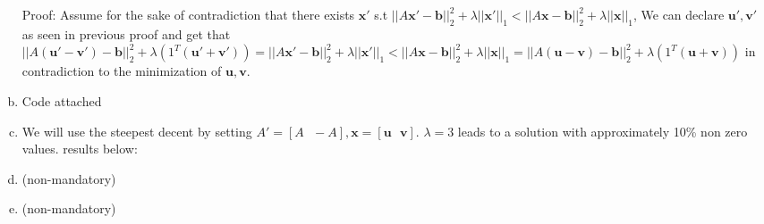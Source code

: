 \documentclass{article}
\begin{document}
\begin{enumerate}[(a)]
Proof: Assume for the sake of contradiction that there exists $\mathbf{x}'$ s.t
$||A\mathbf{x}' - \mathbf{b}||_2^2 + \lambda||\mathbf{x}'||_1 < ||A\mathbf{x} - \mathbf{b}||_2^2 + \lambda||\mathbf{x}||_1$, We can declare $\mathbf{u}', \mathbf{v}'$ as seen in previous proof and get that $||A(\mathbf{u}' - \mathbf{v}') - \mathbf{b}||_2^2 + \lambda(1^T(\mathbf{u}' + \mathbf{v}')) = ||A\mathbf{x}' - \mathbf{b}||_2^2 + \lambda||\mathbf{x}'||_1 < ||A\mathbf{x} - \mathbf{b}||_2^2 + \lambda||\mathbf{x}||_1 = ||A(\mathbf{u} - \mathbf{v}) - \mathbf{b}||_2^2 + \lambda(1^T(\mathbf{u} + \mathbf{v}))$ in contradiction to the minimization of $\mathbf{u}, \mathbf{v}.$

\item Code attached
\item We will use the steepest decent by setting $A'=[A\text{ }-A], \mathbf{x} = [\mathbf{u}\text{ }\mathbf{v}]$. $\lambda=3$ leads to a solution with approximately 10\% non zero values. results below:
\item (non-mandatory)
\item (non-mandatory)
\end{enumerate}
\end{document}
